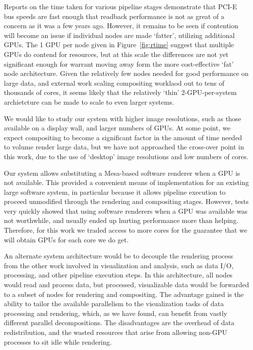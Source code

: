 Reports on the time taken for various pipeline stages demonstrate that
PCI-E bus speeds are fast enough that readback performance is not as
great of a concern as it was a few years ago.  However, it remains to
be seen if contention will become an issue if individual nodes are made
`fatter', utilizing additional GPUs.  The 1 GPU per node given in
Figure~\ref{fig:rtime} suggest that multiple GPUs do contend for
resources, but at this scale the differences are not yet significant
enough for warrant moving away form the more cost-effective `fat'
node architecture.  Given the relatively few nodes needed for good
performance on large data, and external work scaling compositing
worklaod out to tens of thousands of cores, it seems likely that the
relatively `thin' 2-GPU-per-system archietcture can be made to scale
to even larger systems.

We would like to study our system with higher image resolutions, such
as those available on a display wall, and larger numbers of GPUs. At
some point, we expect compositing to become a significant factor in
the amount of time needed to volume render large data, but we have
not approached the cross-over point in this work, due to the use of
`desktop' image resolutions and low numbers of cores.

Our system allows substituting a Mesa-based software renderer
when a GPU is not available. This provided a convenient means of
implementation for an existing large software system, in particular
because it allows pipeline execution to proceed unmodified through
the rendering and compositing stages. However, tests very quickly
showed that using software renderers when a GPU was available was
not worthwhile, and usually ended up hurting performance more than
helping. Therefore, for this work we traded access to more cores for
the guarantee that we will obtain GPUs for each core we do get.

An alternate system architecture would be to decouple the rendering
process from the other work involved in visualization and analysis,
such as data I/O, processing, and other pipeline execution steps. In
this architecture, all nodes would read and process data, but
processed, visualizable data would be forwarded to a subset of nodes
for rendering and compositing. The advantage gained is the ability to
tailor the available parallelism to the visualization tasks of data
processing and rendering, which, as we have found, can benefit from
vastly different parallel decompositions. The disadvantages are the
overhead of data redistribution, and the wasted resources that arise
from allowing non-GPU processes to sit idle while rendering.

